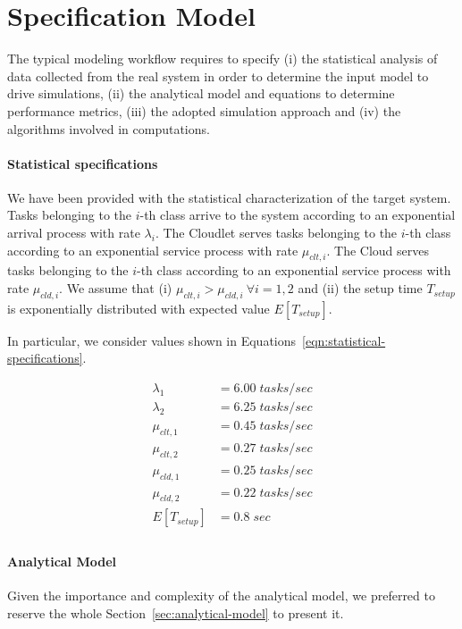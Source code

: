 \section{Specification Model}
\label{sec:performance-modeling-specification-model}
The typical modeling workflow requires to specify
(i) the statistical analysis of data collected from the real system in order to determine the input model to drive simulations,
(ii) the analytical model and equations to determine performance metrics,
(iii) the adopted simulation approach and
(iv) the algorithms involved in computations.

\paragraph{Statistical specifications}
We have been provided with the statistical characterization of the target system.
Tasks belonging to the $i$-th class arrive to the system according to an exponential arrival process with rate $ \lambda_{i}$.
The Cloudlet serves tasks belonging to the $i$-th class according to an exponential service process with rate $\mu_{clt,i}$.
The Cloud serves tasks belonging to the $i$-th class according to an exponential service process with rate $\mu_{cld,i}$.
We assume that 
(i) $\mu_{clt,i}>\mu_{cld,i}\ \forall i=1,2$ and
(ii) the setup time $T_{setup}$ is exponentially distributed with expected value $E[T_{setup}]$.

In particular, we consider values shown in Equations~\ref{eqn:statistical-specifications}.

\begin{equation} 
\begin{split}
\lambda_{1}  &=6.00\;tasks/sec \\
\lambda_{2}  &=6.25\;tasks/sec \\
\mu_{clt,1}  &=0.45\;tasks/sec \\
\mu_{clt,2}  &=0.27\;tasks/sec \\
\mu_{cld,1}  &=0.25\;tasks/sec \\
\mu_{cld,2}  &=0.22\;tasks/sec \\
E[T_{setup}] &=0.8\;sec \\
\end{split}
\label{eqn:statistical-specifications}
\end{equation}

\paragraph{Analytical Model}
Given the importance and complexity of the analytical model, we preferred to reserve the whole Section~\ref{sec:analytical-model} to present it.

